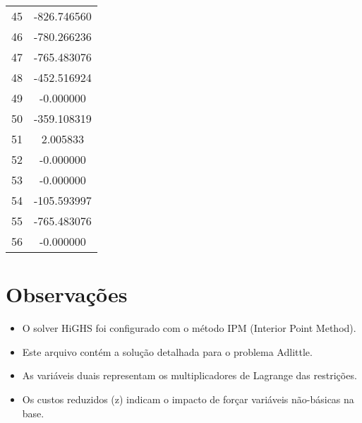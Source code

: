 \documentclass[12pt]{article}
\begin{document}
\begin{longtable}{@{}cc@{}}
45 & -826.746560 \\
46 & -780.266236 \\
47 & -765.483076 \\
48 & -452.516924 \\
49 & -0.000000 \\
50 & -359.108319 \\
51 & 2.005833 \\
52 & -0.000000 \\
53 & -0.000000 \\
54 & -105.593997 \\
55 & -765.483076 \\
56 & -0.000000 \\

\end{longtable}


\section{Observações}

\begin{itemize}
\item O solver HiGHS foi configurado com o método IPM (Interior Point Method).
\item Este arquivo contém a solução detalhada para o problema Adlittle.
\item As variáveis duais representam os multiplicadores de Lagrange das restrições.
\item Os custos reduzidos (z) indicam o impacto de forçar variáveis não-básicas na base.
\end{itemize}
\end{document}
